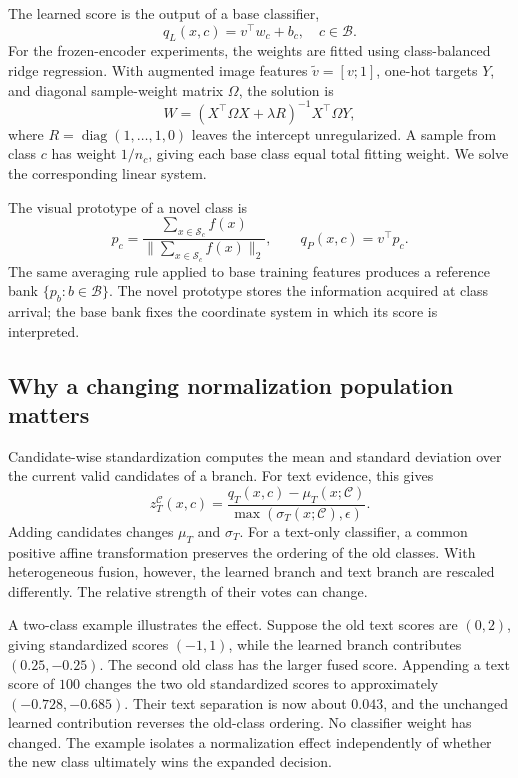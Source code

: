 \documentclass[research]{fcs}
\begin{document}
The learned score is the output of a base classifier,
\begin{equation}
 q_L(x,c)=v^\top w_c+b_c,\quad c\in\mathcal B.
\end{equation}
For the frozen-encoder experiments, the weights are fitted using class-balanced ridge regression. With augmented image features $\widetilde v=[v;1]$, one-hot targets $Y$, and diagonal sample-weight matrix $\Omega$, the solution is
\begin{equation}
 W=(X^\top\Omega X+\lambda R)^{-1}X^\top\Omega Y,
 \label{eq:ridge}
\end{equation}
where $R=\operatorname{diag}(1,\ldots,1,0)$ leaves the intercept unregularized. A sample from class $c$ has weight $1/n_c$, giving each base class equal total fitting weight. We solve the corresponding linear system.

The visual prototype of a novel class is
\begin{equation}
 p_c=\frac{\sum_{x\in\mathcal S_c}f(x)}{\|\sum_{x\in\mathcal S_c}f(x)\|_2},
 \qquad q_P(x,c)=v^\top p_c.
 \label{eq:prototype}
\end{equation}
The same averaging rule applied to base training features produces a reference bank $\{p_b:b\in\mathcal B\}$. The novel prototype stores the information acquired at class arrival; the base bank fixes the coordinate system in which its score is interpreted.

\subsection{Why a changing normalization population matters}
Candidate-wise standardization computes the mean and standard deviation over the current valid candidates of a branch. For text evidence, this gives
\begin{equation}
 z_T^{\mathcal C}(x,c)=\frac{q_T(x,c)-\mu_T(x;\mathcal C)}{\max(\sigma_T(x;\mathcal C),\epsilon)}.
 \label{eq:dynamic}
\end{equation}
Adding candidates changes $\mu_T$ and $\sigma_T$. For a text-only classifier, a common positive affine transformation preserves the ordering of the old classes. With heterogeneous fusion, however, the learned branch and text branch are rescaled differently. The relative strength of their votes can change.

A two-class example illustrates the effect. Suppose the old text scores are $(0,2)$, giving standardized scores $(-1,1)$, while the learned branch contributes $(0.25,-0.25)$. The second old class has the larger fused score. Appending a text score of $100$ changes the two old standardized scores to approximately $(-0.728,-0.685)$. Their text separation is now about $0.043$, and the unchanged learned contribution reverses the old-class ordering. No classifier weight has changed. The example isolates a normalization effect independently of whether the new class ultimately wins the expanded decision.
\end{document}
